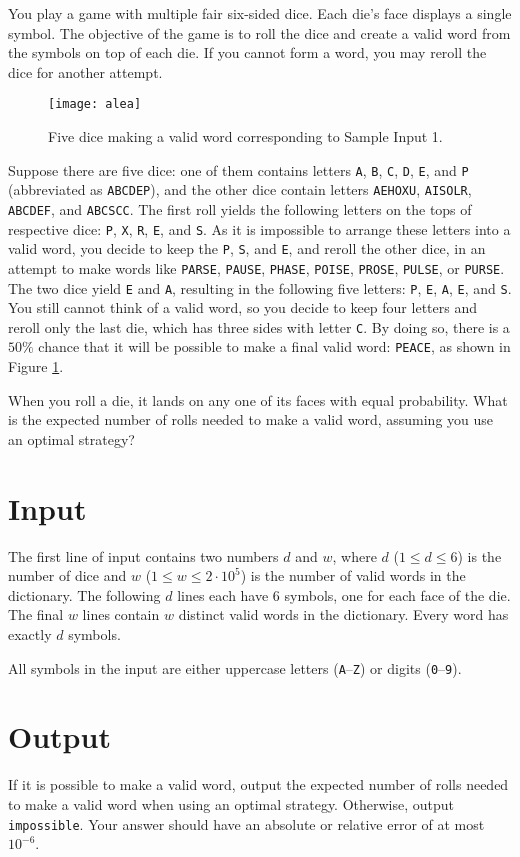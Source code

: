 
You play a game with multiple fair six-sided dice.
Each die's face displays a single symbol.
The objective of the game is to roll the dice and create a valid word from the symbols on top of each die.
If you cannot form a word, you may reroll the dice for another attempt.

\begin{figure}[h]
\centering
\texttt{[image: alea]}
\caption{Five dice making a valid word corresponding to Sample Input 1.}
\label{alea:dice}
\end{figure}

Suppose there are five dice: one of them contains letters \texttt{A}, \texttt{B}, \texttt{C}, \texttt{D}, \texttt{E}, and \texttt{P}
(abbreviated as \texttt{ABCDEP}), and the other dice contain letters \texttt{AEHOXU}, \texttt{AISOLR},
\texttt{ABCDEF}, and \texttt{ABCSCC}. The first roll yields the following letters
on the tops of respective dice: \texttt{P}, \texttt{X}, \texttt{R}, \texttt{E}, and \texttt{S}. As it is impossible to
arrange these letters into a valid word, you decide to keep the \texttt{P}, \texttt{S}, and \texttt{E},
and reroll the other dice, in an attempt to make words like
\texttt{PARSE}, \texttt{PAUSE}, \texttt{PHASE}, \texttt{POISE}, \texttt{PROSE}, \texttt{PULSE}, or \texttt{PURSE}. The two dice yield \texttt{E} and
\texttt{A}, resulting in the following five letters: \texttt{P}, \texttt{E}, \texttt{A}, \texttt{E}, and \texttt{S}. You still cannot
think of a valid word, so you decide to keep four letters and reroll only the
last die, which has three sides with letter \texttt{C}. By doing so, there is a $50\%$ chance
that it will be possible to make a final valid word: {\texttt{PEACE}},
as shown in Figure \ref{alea:dice}.

When you roll a die, it lands on any one of its faces with equal probability.
What is the expected number of rolls needed to make a valid word, assuming you
use an optimal strategy?

\section*{Input}

The first line of input contains two numbers $d$ and $w$, where $d$ ($1 \leq d
\leq 6$) is the number of dice and $w$ ($1 \leq w \leq 2 \cdot 10^5$) is the number of
valid words in the dictionary. The following $d$ lines each have $6$ symbols,
one for each face of the die.
The final $w$ lines contain $w$ distinct valid words in the dictionary. Every word has
exactly $d$ symbols.

All symbols in the input are either uppercase letters (\texttt{A}--\texttt{Z})
or digits (\texttt{0}--\texttt{9}).

\section*{Output}

If it is possible to make a valid word, output the expected number of rolls needed to
make a valid word when using an optimal strategy.  Otherwise, output \texttt{impossible}.
Your answer should have an absolute or relative error of at most $10^{-6}$.
